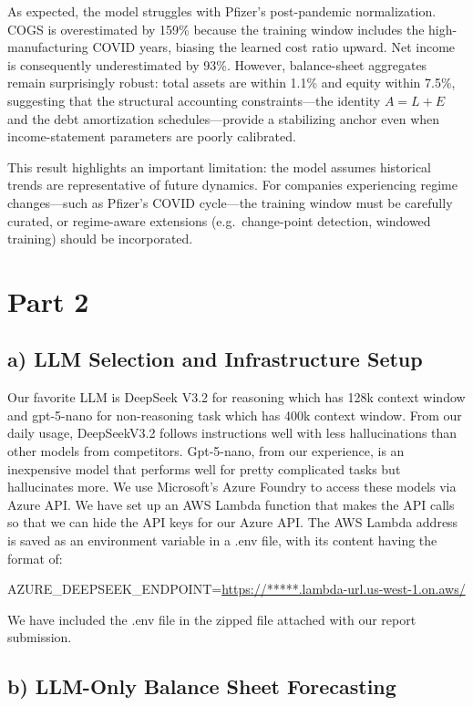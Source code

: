 \documentclass[12pt,a4paper]{article}
\begin{document}
As expected, the model struggles with Pfizer's post-pandemic normalization.
COGS is overestimated by 159\% because the training window includes the
high-manufacturing COVID years, biasing the learned cost ratio upward. Net
income is consequently underestimated by 93\%. However, balance-sheet aggregates
remain surprisingly robust: total assets are within 1.1\% and equity within
7.5\%, suggesting that the structural accounting constraints---the identity
$A = L + E$ and the debt amortization schedules---provide a stabilizing anchor
even when income-statement parameters are poorly calibrated.

This result highlights an important limitation: the model assumes historical
trends are representative of future dynamics. For companies experiencing regime
changes---such as Pfizer's COVID cycle---the training window must be carefully
curated, or regime-aware extensions (e.g.\ change-point detection, windowed
training) should be incorporated.


\section{Part 2}

\subsection{a) LLM Selection and Infrastructure Setup}

Our favorite LLM is DeepSeek V3.2 for reasoning which has 128k context
window and gpt-5-nano for non-reasoning task which has 400k context
window. From our daily usage, DeepSeekV3.2 follows instructions well with
less hallucinations than other models from competitors. Gpt-5-nano, from
our experience, is an inexpensive model that performs well for pretty
complicated tasks but hallucinates more. We use Microsoft's Azure Foundry
to access these models via Azure API. We have set up an AWS Lambda
function that makes the API calls so that we can hide the API keys for
our Azure API. The AWS Lambda address is saved as an environment
variable in a .env file, with its content having the format of:

{\small AZURE\_DEEPSEEK\_ENDPOINT=\url{https://*****.lambda-url.us-west-1.on.aws/}}

We have included the .env file in the zipped file attached with our
report submission.

\subsection{b) LLM-Only Balance Sheet Forecasting}
\end{document}
